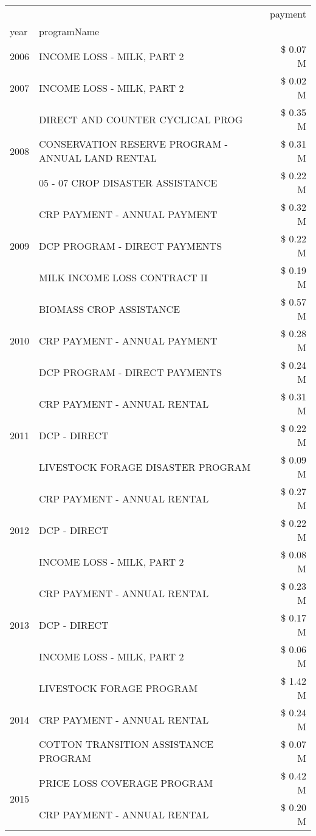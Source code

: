 \begin{tabular}{llr}
\toprule
 &  & payment \\
year & programName &  \\
\midrule
2006 & INCOME LOSS - MILK, PART 2 & \$ 0.07 M \\
\cline{1-3}
2007 & INCOME LOSS - MILK, PART 2 & \$ 0.02 M \\
\cline{1-3}
\multirow[t]{3}{*}{2008} & DIRECT AND COUNTER CYCLICAL PROG & \$ 0.35 M \\
 & CONSERVATION RESERVE PROGRAM - ANNUAL LAND RENTAL & \$ 0.31 M \\
 & 05 - 07 CROP DISASTER ASSISTANCE & \$ 0.22 M \\
\cline{1-3}
\multirow[t]{3}{*}{2009} & CRP PAYMENT - ANNUAL PAYMENT & \$ 0.32 M \\
 & DCP PROGRAM - DIRECT PAYMENTS & \$ 0.22 M \\
 & MILK INCOME LOSS CONTRACT II & \$ 0.19 M \\
\cline{1-3}
\multirow[t]{3}{*}{2010} & BIOMASS CROP ASSISTANCE & \$ 0.57 M \\
 & CRP PAYMENT - ANNUAL PAYMENT & \$ 0.28 M \\
 & DCP PROGRAM - DIRECT PAYMENTS & \$ 0.24 M \\
\cline{1-3}
\multirow[t]{3}{*}{2011} & CRP PAYMENT - ANNUAL RENTAL & \$ 0.31 M \\
 & DCP - DIRECT & \$ 0.22 M \\
 & LIVESTOCK FORAGE DISASTER PROGRAM & \$ 0.09 M \\
\cline{1-3}
\multirow[t]{3}{*}{2012} & CRP PAYMENT - ANNUAL RENTAL & \$ 0.27 M \\
 & DCP - DIRECT & \$ 0.22 M \\
 & INCOME LOSS - MILK, PART 2 & \$ 0.08 M \\
\cline{1-3}
\multirow[t]{3}{*}{2013} & CRP PAYMENT - ANNUAL RENTAL & \$ 0.23 M \\
 & DCP - DIRECT & \$ 0.17 M \\
 & INCOME LOSS - MILK, PART 2 & \$ 0.06 M \\
\cline{1-3}
\multirow[t]{3}{*}{2014} & LIVESTOCK FORAGE PROGRAM & \$ 1.42 M \\
 & CRP PAYMENT - ANNUAL RENTAL & \$ 0.24 M \\
 & COTTON TRANSITION ASSISTANCE PROGRAM & \$ 0.07 M \\
\cline{1-3}
\multirow[t]{3}{*}{2015} & PRICE LOSS COVERAGE PROGRAM & \$ 0.42 M \\
 & CRP PAYMENT - ANNUAL RENTAL & \$ 0.20 M \\

\end{tabular}

